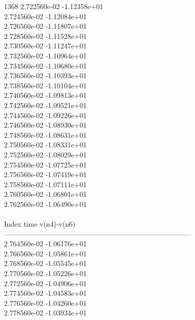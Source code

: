 1368	2.722560e-02	-1.12358e+01	\\ 	2.724560e-02	-1.12084e+01	\\ 	2.726560e-02	-1.11807e+01	\\ 	2.728560e-02	-1.11528e+01	\\ 	2.730560e-02	-1.11247e+01	\\ 	2.732560e-02	-1.10964e+01	\\ 	2.734560e-02	-1.10680e+01	\\ 	2.736560e-02	-1.10393e+01	\\ 	2.738560e-02	-1.10104e+01	\\ 	2.740560e-02	-1.09813e+01	\\ 	2.742560e-02	-1.09521e+01	\\ 	2.744560e-02	-1.09226e+01	\\ 	2.746560e-02	-1.08930e+01	\\ 	2.748560e-02	-1.08631e+01	\\ 	2.750560e-02	-1.08331e+01	\\ 	2.752560e-02	-1.08029e+01	\\ 	2.754560e-02	-1.07725e+01	\\ 	2.756560e-02	-1.07419e+01	\\ 	2.758560e-02	-1.07111e+01	\\ 	2.760560e-02	-1.06801e+01	\\ 	2.762560e-02	-1.06490e+01	\\ \hline
\\ \hline
Index   time            v(n4)-v(n6)     \\ \hline
--------------------------------------------------------------------------------\\ 	2.764560e-02	-1.06176e+01	\\ 	2.766560e-02	-1.05861e+01	\\ 	2.768560e-02	-1.05545e+01	\\ 	2.770560e-02	-1.05226e+01	\\ 	2.772560e-02	-1.04906e+01	\\ 	2.774560e-02	-1.04583e+01	\\ 	2.776560e-02	-1.04260e+01	\\ 	2.778560e-02	-1.03934e+01	\\ \hline
